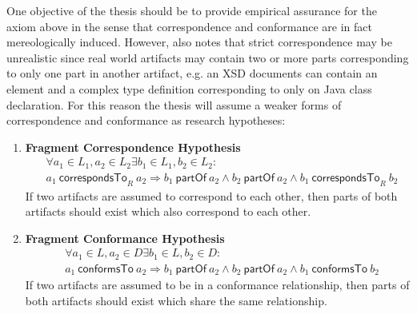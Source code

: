 \documentclass[runningheads,a4paper]{llncs}
\newcommand{\partOf}{~\textsf{partOf}~}
\newcommand{\correspondsToR}[1]{~\textsf{correspondsTo}_{#1}~}
\newcommand{\conformsTo}{~\textsf{conformsTo}~}
\begin{document}
One objective of the thesis should be to provide empirical assurance for the axiom above in the sense that correspondence and conformance are in fact mereologically induced.
However, \cite{DBLP:conf/sle/Lammel16} also notes that strict correspondence may be unrealistic since real world artifacts may contain two or more parts corresponding to only one part in another artifact, e.g. an XSD documents can contain an element and a complex type definition corresponding to only on Java class declaration.
For this reason the thesis will assume a weaker forms of correspondence and conformance as research hypotheses:
\begin{enumerate}[RH1]
\item
\textbf{Fragment Correspondence Hypothesis}
\begin{align*}
&\forall a_1 \in L_1, a_2 \in L_2 \exists b_1 \in L_1, b_2 \in L_2 :  
\\&a_1 \correspondsToR{R} a_2
\Rightarrow 
b_1 \partOf a_2 \wedge b_2 \partOf a_2 \wedge b_1 \correspondsToR{R} b_2
\end{align*}
If two artifacts are assumed to correspond to each other, then parts of both artifacts should exist which also correspond to each other.

\item
\textbf{Fragment Conformance Hypothesis}
\begin{align*}
&\forall a_1 \in L, a_2 \in D \exists b_1 \in L, b_2 \in D : 
\\&a_1 \conformsTo a_2
\Rightarrow 
b_1 \partOf a_2 \wedge b_2 \partOf a_2 \wedge b_1 \conformsTo b_2
\end{align*}
If two artifacts are assumed to be in a conformance relationship, then parts of both artifacts should exist which share the same relationship.
\end{enumerate}
\end{document}

